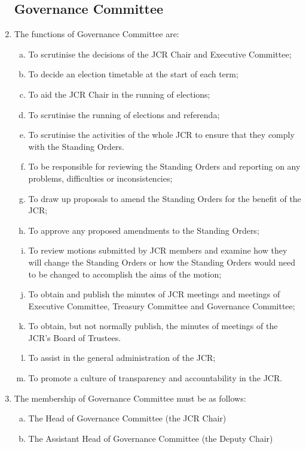 \documentclass[12pt]{article}
\begin{document}
\begin{enumerate}
    \subsection{Governance Committee}
    \item The functions of Governance Committee are:
    \begin{enumerate}[(a)]
        \item To scrutinise the decisions of the JCR Chair and Executive Committee;
        \item To decide an election timetable at the start of each term;
        \item To aid the JCR Chair in the running of elections;
        \item To scrutinise the running of elections and referenda;
        \item To scrutinise the activities of the whole JCR to ensure that they comply with the Standing Orders.
        \item To be responsible for reviewing the Standing Orders and reporting on any problems, difficulties or inconsistencies;
        \item To draw up proposals to amend the Standing Orders for the benefit of the JCR;
        \item To approve any proposed amendments to the Standing Orders;
        \item To review motions submitted by JCR members and examine how they will change the Standing Orders or how the Standing Orders would need to be changed to accomplish the aims of the motion;
        \item To obtain and publish the minutes of JCR meetings and meetings of Executive Committee, Treasury Committee and Governance Committee;
        \item To obtain, but not normally publish, the minutes of meetings of the JCR’s Board of Trustees.
        \item To assist in the general administration of the JCR;
        \item To promote a culture of transparency and accountability in the JCR.
    \end{enumerate}
    \item The membership of Governance Committee must be as follows:
    \begin{enumerate}[(a)]
        \item The Head of Governance Committee (the JCR Chair)
        \item The Assistant Head of Governance Committee (the Deputy Chair)

\end{enumerate}
\end{enumerate}
\end{document}
